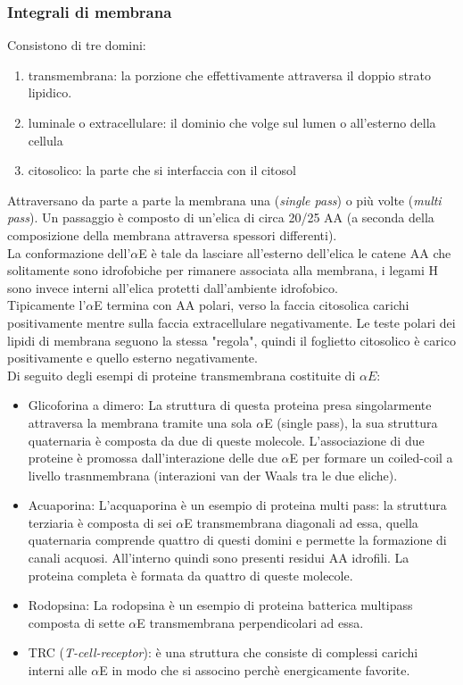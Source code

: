         \subsubsection{Integrali di membrana}
            Consistono di tre domini:
            \begin{enumerate}
                \item transmembrana: la porzione che effettivamente attraversa il doppio strato lipidico.
                \item luminale o extracellulare: il dominio che volge sul lumen o all'esterno della cellula
                \item citosolico: la parte che si interfaccia con il citosol
            \end{enumerate}
            Attraversano da parte a parte la membrana una (\textit{single pass}) o più volte (\textit{multi pass}). Un passaggio è composto di un'elica di circa 20/25 AA (a seconda della composizione della membrana attraversa spessori differenti).\\
            La conformazione dell'$\alpha$E è tale da lasciare all'esterno dell'elica le catene AA che solitamente sono idrofobiche per rimanere associata alla membrana, i legami H sono invece interni all'elica protetti dall'ambiente idrofobico.\\
            Tipicamente l'$\alpha$E termina con AA polari, verso la faccia citosolica carichi positivamente mentre sulla faccia extracellulare negativamente.
            Le teste polari dei lipidi di membrana seguono la stessa "regola", quindi il foglietto citosolico è carico positivamente e quello esterno negativamente.\\
            Di seguito degli esempi di proteine transmembrana costituite di $\alpha E$:
            \begin{itemize}
                \item {Glicoforina a dimero}:
                La struttura di questa proteina presa singolarmente attraversa la membrana tramite una sola $\alpha$E (single pass), la sua struttura quaternaria è composta da due di queste molecole.
                L'associazione di due proteine è promossa dall'interazione delle due $\alpha$E per formare un coiled-coil a livello trasnmembrana (interazioni van der Waals tra le due eliche).
                \item{Acuaporina}:
                L'acquaporina è un esempio di proteina multi pass: la struttura terziaria è composta di sei $\alpha$E transmembrana diagonali ad essa, quella quaternaria comprende quattro di questi domini e permette la formazione di canali acquosi. All'interno quindi sono presenti residui AA idrofili.
                La proteina completa è formata da quattro di queste molecole.
                \item{Rodopsina}:
                La rodopsina è un esempio di proteina batterica multipass composta di sette $\alpha$E transmembrana perpendicolari ad essa.
                \item{TRC (\textit{T-cell-receptor})}:
                è una struttura che consiste di complessi carichi interni alle $\alpha$E in modo che si associno perchè energicamente favorite.
            \end{itemize}
